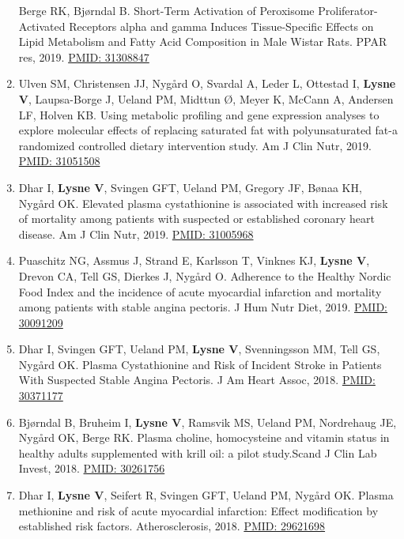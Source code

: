 \documentclass[11pt, a4paper]{awesome-cv}
\begin{document}
\begin{enumerate}
  Berge RK, Bjørndal B. Short-Term Activation of Peroxisome
  Proliferator-Activated Receptors alpha and gamma Induces
  Tissue-Specific Effects on Lipid Metabolism and Fatty Acid Composition
  in Male Wistar Rats. PPAR res, 2019.
  \href{https://www.ncbi.nlm.nih.gov/pubmed/31308847}{PMID: 31308847}
\item
  Ulven SM, Christensen JJ, Nygård O, Svardal A, Leder L, Ottestad I,
  \textbf{Lysne V}, Laupsa-Borge J, Ueland PM, Midttun Ø, Meyer K,
  McCann A, Andersen LF, Holven KB. Using metabolic profiling and gene
  expression analyses to explore molecular effects of replacing
  saturated fat with polyunsaturated fat-a randomized controlled dietary
  intervention study. Am J Clin Nutr, 2019.
  \href{https://www.ncbi.nlm.nih.gov/pubmed/31051508}{PMID: 31051508}
\item
  Dhar I, \textbf{Lysne V}, Svingen GFT, Ueland PM, Gregory JF, Bønaa
  KH, Nygård OK. Elevated plasma cystathionine is associated with
  increased risk of mortality among patients with suspected or
  established coronary heart disease. Am J Clin Nutr, 2019.
  \href{https://www.ncbi.nlm.nih.gov/pubmed/31005968}{PMID: 31005968}
\item
  Puaschitz NG, Assmus J, Strand E, Karlsson T, Vinknes KJ,
  \textbf{Lysne V}, Drevon CA, Tell GS, Dierkes J, Nygård O. Adherence
  to the Healthy Nordic Food Index and the incidence of acute myocardial
  infarction and mortality among patients with stable angina pectoris. J
  Hum Nutr Diet, 2019.
  \href{https://www.ncbi.nlm.nih.gov/pubmed/30091209}{PMID: 30091209}
\item
  Dhar I, Svingen GFT, Ueland PM, \textbf{Lysne V}, Svenningsson MM,
  Tell GS, Nygård OK. Plasma Cystathionine and Risk of Incident Stroke
  in Patients With Suspected Stable Angina Pectoris. J Am Heart Assoc,
  2018. \href{https://www.ncbi.nlm.nih.gov/pubmed/30371177}{PMID:
  30371177}
\item
  Bjørndal B, Bruheim I, \textbf{Lysne V}, Ramsvik MS, Ueland PM,
  Nordrehaug JE, Nygård OK, Berge RK. Plasma choline, homocysteine and
  vitamin status in healthy adults supplemented with krill oil: a pilot
  study.Scand J Clin Lab Invest, 2018.
  \href{https://www.ncbi.nlm.nih.gov/pubmed/30261756}{PMID: 30261756}
\item
  Dhar I, \textbf{Lysne V}, Seifert R, Svingen GFT, Ueland PM, Nygård
  OK. Plasma methionine and risk of acute myocardial infarction: Effect
  modification by established risk factors. Atherosclerosis, 2018.
  \href{https://www.ncbi.nlm.nih.gov/pubmed/29621698}{PMID: 29621698}

\end{enumerate}
\end{document}
